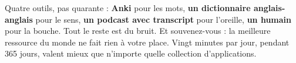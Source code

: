 \begin{memo}
Quatre outils, pas quarante : \textbf{Anki} pour les mots, \textbf{un dictionnaire
anglais-anglais} pour le sens, \textbf{un podcast avec transcript} pour l'oreille,
\textbf{un humain} pour la bouche. Tout le reste est du bruit. Et souvenez-vous : la
meilleure ressource du monde ne fait rien à votre place. Vingt minutes par jour, pendant
365 jours, valent mieux que n'importe quelle collection d'applications.
\end{memo}
